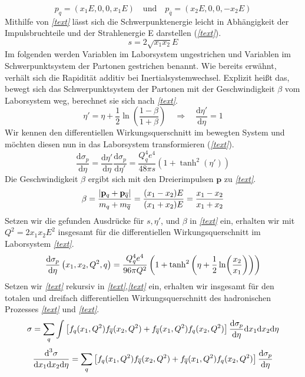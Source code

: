 \begin{equation}
	p_q = \left(x_1E, 0, 0, x_1E\right) \quad \text{und} \quad p_{\overline{q}} = \left(x_2E, 0, 0, -x_2E\right)
\end{equation}
Mithilfe von \textit{\autoref{text}} lässt sich die Schwerpunktenergie leicht in Abhängigkeit der Impulsbruchteile und der Strahlenergie E darstellen (\textit{\autoref{text}}).
\begin{equation}
	s = 2\sqrt{x_1x_2}E
\end{equation}
Im folgenden werden Variablen im Laborsystem ungestrichen und Variablen im Schwerpunktsystem der Partonen gestrichen benannt. Wie bereits erwähnt, verhält sich die Rapidität additiv bei Inertialsystemwechsel. Explizit heißt das, bewegt sich das Schwerpunktsystem der Partonen mit der Geschwindigkeit $\beta$ vom Laborsystem weg, berechnet sie sich nach \textit{\autoref{text}}.
\begin{equation}
	\eta' = \eta + \frac{1}{2}\ln(\frac{1-\beta}{1+\beta}) \quad \Rightarrow \quad \frac{\text{d}\eta'}{\text{d}\eta} = 1 
\end{equation}
Wir kennen den differentiellen Wirkungsquerschnitt im bewegten System und möchten diesen nun in das Laborsystem transformieren (\textit{\autoref{text}}). 
\begin{equation}
	\frac{\text{d}\sigma_p}{\text{d}\eta} = \frac{\text{d}\eta'}{\text{d}\eta} \frac{\text{d}\sigma_p}{\text{d}\eta'} = \frac{Q_q^4e^4}{48\pi s}(1+\tanh^2(\eta'))
\end{equation}
Die Geschwindigkeit $\beta$ ergibt sich mit den Dreierimpulsen $\mathbf{p}$ zu \textit{\autoref{text}}.
\begin{equation}
	\beta = \frac{\abs{\mathbf{p}_q + \mathbf{p}_{\overline{q}}}}{m_q + m_{\overline{q}}} = \frac{(x_1 - x_2)E}{(x_1 + x_2)E} = \frac{x_1 - x_2}{x_1 + x_2}
\end{equation}
Setzen wir die gefunden Ausdrücke für $s, \eta'$, und $\beta$ in \textit{\autoref{text}} ein, erhalten wir mit $Q^2 = 2 x_1 x_2 E^2$ insgesamt für die differentiellen Wirkungsquerschnitt im Laborsystem \textit{\autoref{text}}.
\begin{equation}
	\derivative{\sigma_p}{\eta}\left(x_1, x_2, Q^2, q\right) = \frac{Q_q^4e^4}{96\pi Q^2} \left(1+\tanh^2\left(\eta + \frac{1}{2}\ln(\frac{x_2}{x_1})\right)\right)
\end{equation}
Setzen wir \textit{\autoref{text}} rekursiv in \textit{\autoref{text}},\textit{\autoref{text}} ein, erhalten wir insgesamt für den totalen und dreifach differentiellen Wirkungsquerschnitt des hadronischen Prozesses \textit{\autoref{text}} und \textit{\autoref{text}}.
\begin{equation}
	\sigma = \sum_{q} \int \left[f_q(x_1, Q^2)f_{\overline{q}}(x_2, Q^2) +f_{\overline{q}}(x_1, Q^2)f_{q}(x_2, Q^2) \right] \derivative{\sigma_p}{\eta} \text{d}x_1\text{d}x_2\text{d}\eta
\end{equation}
\begin{equation}
	\frac{\text{d}^3\sigma}{\text{d}x_1\text{d}x_2\text{d}\eta} = \sum_{q} \left[f_q(x_1, Q^2)f_{\overline{q}}(x_2, Q^2) +f_{\overline{q}}(x_1, Q^2)f_{q}(x_2, Q^2) \right] \derivative{\sigma_p}{\eta} 
\end{equation}
